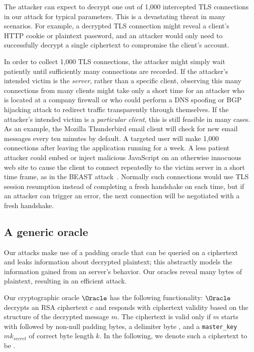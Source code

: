 The attacker can expect to decrypt one out of 1,000 intercepted TLS connections in our attack for typical parameters.  This is a devastating threat in many scenarios.  For example, a decrypted TLS connection might reveal a client's HTTP cookie or plaintext password, and an attacker would only need to successfully decrypt a single ciphertext to compromise the client's account.

In order to collect 1,000 TLS connections, the attacker might simply wait patiently until sufficiently many connections are recorded.  If the attacker's intended victim is the \emph{server}, rather than a specific client, observing this many connections from many clients might take only a short time for an attacker who is located at a company firewall or who could perform a DNS spoofing or BGP hijacking attack to redirect traffic transparently through themselves.  If the attacker's intended victim is a \emph{particular client}, this is still feasible in many cases.  As an example, the Mozilla Thunderbird email client will check for new email messages every ten minutes by default.  A targeted user will make 1,000 connections after leaving the application running for a week.  A less patient attacker could embed or inject malicious JavaScript on an otherwise innocuous web site to cause the client to connect repeatedly to the victim server in a short time frame, as in the BEAST attack~\cite{BEAST}.  Normally such connections would use TLS session resumption instead of completing a fresh handshake on each time, but if an attacker can trigger an error, the next connection will be negotiated with a fresh handshake.


\subsection{A generic \ssltwo oracle}

Our attacks make use of a padding oracle that can be queried on a ciphertext and leaks information about decrypted plaintext; this abstractly models the information gained from an \ssltwo server's behavior.  Our \ssltwo oracles reveal many bytes of plaintext, resulting in an efficient attack.

Our cryptographic oracle $\Oracle$ has the following functionality: 
$\Oracle$ decrypts an RSA ciphertext $c$ and responds with ciphertext validity based on the structure of the decrypted message $m$.  
The ciphertext is valid only if $m$ starts with  followed by non-null padding bytes, a delimiter byte , and a \texttt{master\_key} $mk_{secret}$ of correct byte length $k$.
In the following, we denote such a ciphertext to be \textit{\sslconform}.

